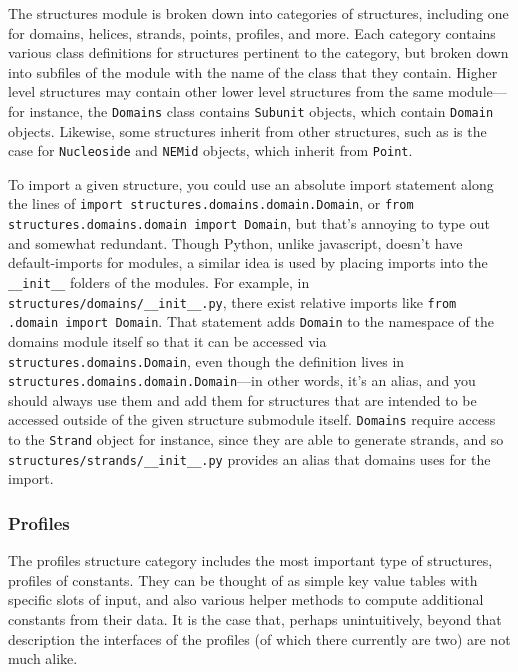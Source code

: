 \documentclass[titlepage]{article}
\begin{document}
	The structures module is broken down into categories of structures, including one for domains, helices, strands, points, profiles, and more. Each category contains various class definitions for structures pertinent to the category, but broken down into subfiles of the module with the name of the class that they contain. Higher level structures may contain other lower level structures from the same module---for instance, the \texttt{Domains} class contains \texttt{Subunit} objects, which contain \texttt{Domain} objects. Likewise, some structures inherit from other structures, such as is the case for \texttt{Nucleoside} and \texttt{NEMid} objects, which inherit from \texttt{Point}.
	
	To import a given structure, you could use an absolute import statement along the lines of \texttt{import structures.domains.domain.Domain}, or \texttt{from structures.domains.domain import Domain}, but that's annoying to type out and somewhat redundant. Though Python, unlike javascript, doesn't have default-imports for modules, a similar idea is used by placing imports into the \texttt{\_\_init\_\_} folders of the modules. For example, in \texttt{structures/domains/\_\_init\_\_.py}, there exist relative imports like \texttt{from .domain import Domain}. That statement adds \texttt{Domain} to the namespace of the domains module itself so that it can be accessed via \texttt{structures.domains.Domain}, even though the definition lives in \texttt{structures.domains.domain.Domain}---in other words, it's an alias, and you should always use them and add them for structures that are intended to be accessed outside of the given structure submodule itself. \texttt{Domains} require access to the \texttt{Strand} object for instance, since they are able to generate strands, and so \texttt{structures/strands/\_\_init\_\_.py} provides an alias that domains uses for the import.
	
	\subsubsection{Profiles}
	The profiles structure category includes the most important type of structures, profiles of constants. They can be thought of as simple key value tables with specific slots of input, and also various helper methods to compute additional constants from their data. It is the case that, perhaps unintuitively, beyond that description the interfaces of the profiles (of which there currently are two) are not much alike.
	
\end{document}
